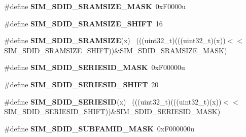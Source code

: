 \begin{DoxyCompactItemize}
\item 
\hypertarget{group___s_i_m___register___masks_gaedb71533a342dcb2cc83241898378b70}{}\#define {\bfseries S\+I\+M\+\_\+\+S\+D\+I\+D\+\_\+\+S\+R\+A\+M\+S\+I\+Z\+E\+\_\+\+M\+A\+S\+K}~0x\+F0000u\label{group___s_i_m___register___masks_gaedb71533a342dcb2cc83241898378b70}

\item 
\hypertarget{group___s_i_m___register___masks_ga096c5cec8db3701100c59233e3db0584}{}\#define {\bfseries S\+I\+M\+\_\+\+S\+D\+I\+D\+\_\+\+S\+R\+A\+M\+S\+I\+Z\+E\+\_\+\+S\+H\+I\+F\+T}~16\label{group___s_i_m___register___masks_ga096c5cec8db3701100c59233e3db0584}

\item 
\hypertarget{group___s_i_m___register___masks_ga8626bb5e04b86f4ee79d1f27b3a34183}{}\#define {\bfseries S\+I\+M\+\_\+\+S\+D\+I\+D\+\_\+\+S\+R\+A\+M\+S\+I\+Z\+E}(x)                                      ~(((uint32\+\_\+t)(((uint32\+\_\+t)(x))$<$$<$S\+I\+M\+\_\+\+S\+D\+I\+D\+\_\+\+S\+R\+A\+M\+S\+I\+Z\+E\+\_\+\+S\+H\+I\+F\+T))\&S\+I\+M\+\_\+\+S\+D\+I\+D\+\_\+\+S\+R\+A\+M\+S\+I\+Z\+E\+\_\+\+M\+A\+S\+K)\label{group___s_i_m___register___masks_ga8626bb5e04b86f4ee79d1f27b3a34183}

\item 
\hypertarget{group___s_i_m___register___masks_ga014f6aec38e92afbd07904db6ed617d0}{}\#define {\bfseries S\+I\+M\+\_\+\+S\+D\+I\+D\+\_\+\+S\+E\+R\+I\+E\+S\+I\+D\+\_\+\+M\+A\+S\+K}~0x\+F00000u\label{group___s_i_m___register___masks_ga014f6aec38e92afbd07904db6ed617d0}

\item 
\hypertarget{group___s_i_m___register___masks_ga47e31524526fda3e3058a55da89d098b}{}\#define {\bfseries S\+I\+M\+\_\+\+S\+D\+I\+D\+\_\+\+S\+E\+R\+I\+E\+S\+I\+D\+\_\+\+S\+H\+I\+F\+T}~20\label{group___s_i_m___register___masks_ga47e31524526fda3e3058a55da89d098b}

\item 
\hypertarget{group___s_i_m___register___masks_ga8075b9d9fa16ec3d3c195ce75571dcf7}{}\#define {\bfseries S\+I\+M\+\_\+\+S\+D\+I\+D\+\_\+\+S\+E\+R\+I\+E\+S\+I\+D}(x)                                      ~(((uint32\+\_\+t)(((uint32\+\_\+t)(x))$<$$<$S\+I\+M\+\_\+\+S\+D\+I\+D\+\_\+\+S\+E\+R\+I\+E\+S\+I\+D\+\_\+\+S\+H\+I\+F\+T))\&S\+I\+M\+\_\+\+S\+D\+I\+D\+\_\+\+S\+E\+R\+I\+E\+S\+I\+D\+\_\+\+M\+A\+S\+K)\label{group___s_i_m___register___masks_ga8075b9d9fa16ec3d3c195ce75571dcf7}

\item 
\hypertarget{group___s_i_m___register___masks_ga530d8fe59d2589cf56c00456e89487aa}{}\#define {\bfseries S\+I\+M\+\_\+\+S\+D\+I\+D\+\_\+\+S\+U\+B\+F\+A\+M\+I\+D\+\_\+\+M\+A\+S\+K}~0x\+F000000u\label{group___s_i_m___register___masks_ga530d8fe59d2589cf56c00456e89487aa}


\end{DoxyCompactItemize}
